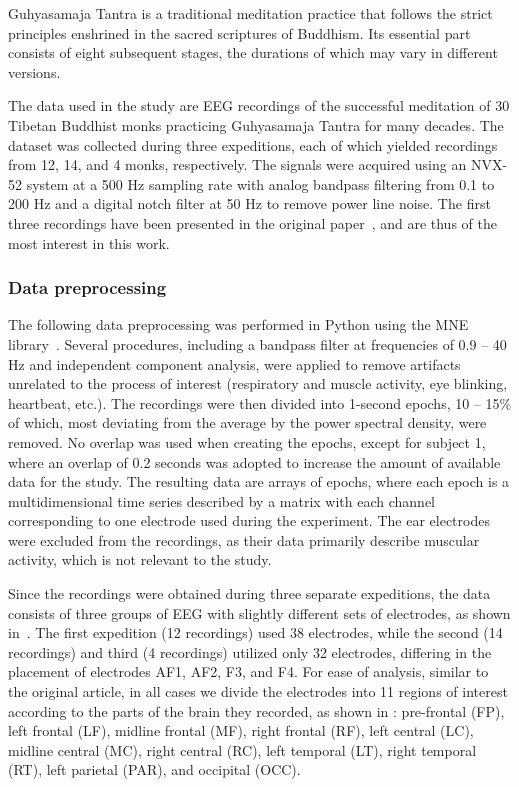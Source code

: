 \documentclass[10pt]{iopart}
\begin{document}
Guhyasamaja Tantra is a traditional meditation practice that follows the strict principles enshrined in the sacred scriptures of Buddhism. Its essential part consists of eight subsequent stages, the durations of which may vary in different versions.

The data used in the study are EEG recordings of the successful meditation of 30 Tibetan Buddhist monks practicing Guhyasamaja Tantra for many decades. The dataset was collected during three expeditions, each of which yielded recordings from 12, 14, and 4 monks, respectively. The signals were acquired using an NVX-52 system at a 500 Hz sampling rate with analog bandpass filtering from 0.1 to 200 Hz and a digital notch filter at 50 Hz to remove power line noise. The first three recordings have been presented in the original paper~\cite{SDA}, and are thus of the most interest in this work. 

\subsubsection{Data preprocessing}

The following data preprocessing was performed in Python using the MNE library~\cite{MNE}. Several procedures, including a bandpass filter at frequencies of 0.9 -- 40 Hz and independent component analysis, were applied to remove artifacts unrelated to the process of interest (respiratory and muscle activity, eye blinking, heartbeat, etc.). The recordings were then divided into 1-second epochs, 10 -- 15\% of which, most deviating from the average by the power spectral density, were removed. No overlap was used when creating the epochs, except for subject 1, where an overlap of 0.2 seconds was adopted to increase the amount of available data for the study. The resulting data are arrays of epochs, where each epoch is a multidimensional time series described by a matrix with each channel corresponding to one electrode used during the experiment. The ear electrodes were excluded from the recordings, as their data primarily describe muscular activity, which is not relevant to the study.

Since the recordings were obtained during three separate expeditions, the data consists of three groups of EEG with slightly different sets of electrodes, as shown in~. The first expedition (12 recordings) used 38 electrodes, while the second (14 recordings) and third (4 recordings) utilized only 32 electrodes, differing in the placement of electrodes AF1, AF2, F3, and F4. For ease of analysis, similar to the original article, in all cases we divide the electrodes into 11 regions of interest according to the parts of the brain they recorded, as shown in : pre-frontal (FP), left frontal (LF), midline frontal (MF), right frontal (RF), left central (LC), midline central (MC), right central (RC), left temporal (LT), right temporal (RT), left parietal (PAR), and occipital (OCC).
\end{document}
